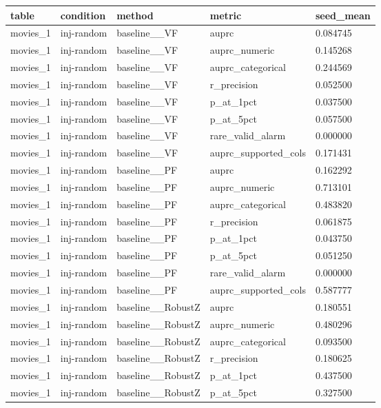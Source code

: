 \begin{tabular}{lllll}
\hline
table & condition & method & metric & seed\_mean \\
\hline
movies\_1 & inj-random & baseline\_\_VF & auprc & 0.084745 \\
movies\_1 & inj-random & baseline\_\_VF & auprc\_numeric & 0.145268 \\
movies\_1 & inj-random & baseline\_\_VF & auprc\_categorical & 0.244569 \\
movies\_1 & inj-random & baseline\_\_VF & r\_precision & 0.052500 \\
movies\_1 & inj-random & baseline\_\_VF & p\_at\_1pct & 0.037500 \\
movies\_1 & inj-random & baseline\_\_VF & p\_at\_5pct & 0.057500 \\
movies\_1 & inj-random & baseline\_\_VF & rare\_valid\_alarm & 0.000000 \\
movies\_1 & inj-random & baseline\_\_VF & auprc\_supported\_cols & 0.171431 \\
movies\_1 & inj-random & baseline\_\_PF & auprc & 0.162292 \\
movies\_1 & inj-random & baseline\_\_PF & auprc\_numeric & 0.713101 \\
movies\_1 & inj-random & baseline\_\_PF & auprc\_categorical & 0.483820 \\
movies\_1 & inj-random & baseline\_\_PF & r\_precision & 0.061875 \\
movies\_1 & inj-random & baseline\_\_PF & p\_at\_1pct & 0.043750 \\
movies\_1 & inj-random & baseline\_\_PF & p\_at\_5pct & 0.051250 \\
movies\_1 & inj-random & baseline\_\_PF & rare\_valid\_alarm & 0.000000 \\
movies\_1 & inj-random & baseline\_\_PF & auprc\_supported\_cols & 0.587777 \\
movies\_1 & inj-random & baseline\_\_RobustZ & auprc & 0.180551 \\
movies\_1 & inj-random & baseline\_\_RobustZ & auprc\_numeric & 0.480296 \\
movies\_1 & inj-random & baseline\_\_RobustZ & auprc\_categorical & 0.093500 \\
movies\_1 & inj-random & baseline\_\_RobustZ & r\_precision & 0.180625 \\
movies\_1 & inj-random & baseline\_\_RobustZ & p\_at\_1pct & 0.437500 \\
movies\_1 & inj-random & baseline\_\_RobustZ & p\_at\_5pct & 0.327500 \\

\end{tabular}
